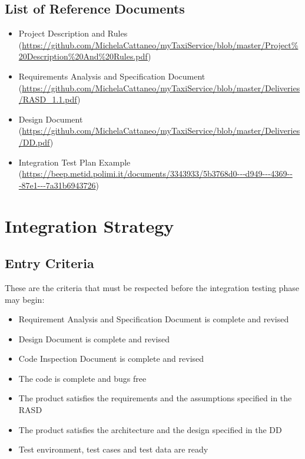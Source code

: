 \documentclass[18pt,oneside,a4paper, titlepage]{article}
\begin{document}
	\subsection{List of	Reference Documents}
		\begin{itemize}
			\item Project Description and Rules (\url{https://github.com/MichelaCattaneo/myTaxiService/blob/master/Project\%20Description\%20And\%20Rules.pdf})
			\item Requirements Analysis and Specification Document (\url{https://github.com/MichelaCattaneo/myTaxiService/blob/master/Deliveries/RASD_1.1.pdf})
			\item Design Document (\url{https://github.com/MichelaCattaneo/myTaxiService/blob/master/Deliveries/DD.pdf})
			\item Integration Test Plan Example (\url{https://beep.metid.polimi.it/documents/3343933/5b3768d0-­‐‑d949-­‐‑4369-­‐‑87e1-­‐‑7a31b6943726})
		\end{itemize}

\newpage
\section{Integration Strategy}
	\subsection{Entry Criteria}	
		These are the criteria that must be respected before the integration testing phase may begin:
		\begin{itemize}
			\item Requirement Analysis and Specification Document is complete and revised
			\item Design Document is complete and revised
			\item Code Inspection Document is complete and revised
			\item The code is complete and bugs free
			\item The product satisfies the requirements and the assumptions specified in the RASD
			\item The product satisfies the architecture and the design specified in the DD
			\item Test environment, test cases and test data are ready
		\end{itemize}	
\end{document}

